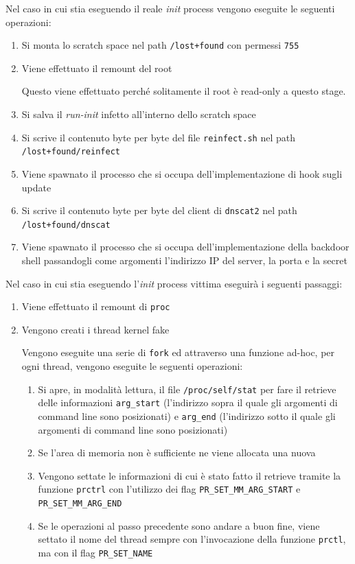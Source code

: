 \documentclass[oneside]{article}
\begin{document}
Nel caso in cui stia eseguendo il reale \textit{init} process vengono eseguite le seguenti operazioni:
\begin{enumerate}
\item Si monta lo scratch space nel path \texttt{/lost+found} con permessi \texttt{755}
\item Viene effettuato il remount del root

Questo viene effettuato perché solitamente il root è read-only a questo stage.
\item Si salva il \textit{run-init} infetto all'interno dello scratch space
\item Si scrive il contenuto byte per byte del file \texttt{reinfect.sh} nel path \texttt{/lost+found/reinfect}
\item Viene spawnato il processo che si occupa dell'implementazione di hook sugli update
\item Si scrive il contenuto byte per byte del client di \texttt{dnscat2} nel path \texttt{/lost+found/dnscat}
\item Viene spawnato il processo che si occupa dell'implementazione della backdoor shell passandogli come argomenti l'indirizzo IP del server, la porta e la secret
\end{enumerate}

Nel caso in cui stia eseguendo l'\textit{init} process vittima eseguirà i seguenti passaggi:
\begin{enumerate}
\item Viene effettuato il remount di \texttt{proc}
\item Vengono creati i thread kernel fake

Vengono eseguite una serie di \texttt{fork} ed attraverso una funzione ad-hoc, per ogni thread, vengono eseguite le seguenti operazioni:
\begin{enumerate}
\item Si apre, in modalità lettura, il file \texttt{/proc/self/stat} per fare il retrieve delle informazioni \texttt{arg\_start} (l'indirizzo sopra il quale gli argomenti di command line sono posizionati) e \texttt{arg\_end} (l'indirizzo sotto il quale gli argomenti di command line sono posizionati)
\item Se l'area di memoria non è sufficiente ne viene allocata una nuova
\item Vengono settate le informazioni di cui è stato fatto il retrieve tramite la funzione \texttt{prctrl} con l'utilizzo dei flag \texttt{PR\_SET\_MM\_ARG\_START} e \texttt{PR\_SET\_MM\_ARG\_END}
\item Se le operazioni al passo precedente sono andare a buon fine, viene settato il nome del thread sempre con l'invocazione della funzione \texttt{prctl}, ma con il flag \texttt{PR\_SET\_NAME}	
\end{enumerate}
\end{enumerate}
\end{document}
